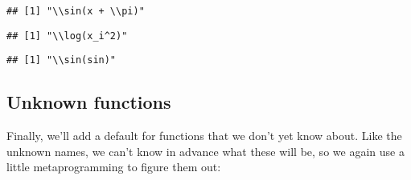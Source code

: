 \begin{verbatim}
## [1] "\\sin(x + \\pi)"
\end{verbatim}

\begin{Shaded}
\begin{Highlighting}[]
\NormalTok{(}\OperatorTok{^}\StringTok{ }\NormalTok{))}
\end{Highlighting}
\end{Shaded}

\begin{verbatim}
## [1] "\\log(x_i^2)"
\end{verbatim}

\begin{Shaded}
\begin{Highlighting}[]
\NormalTok{(}
\end{Highlighting}
\end{Shaded}

\begin{verbatim}
## [1] "\\sin(sin)"
\end{verbatim}

\hypertarget{unknown-functions}{%
\subsection{Unknown functions}\label{unknown-functions}}

Finally, we'll add a default for functions that we don't yet know about.
Like the unknown names, we can't know in advance what these will be, so
we again use a little metaprogramming to figure them out:

